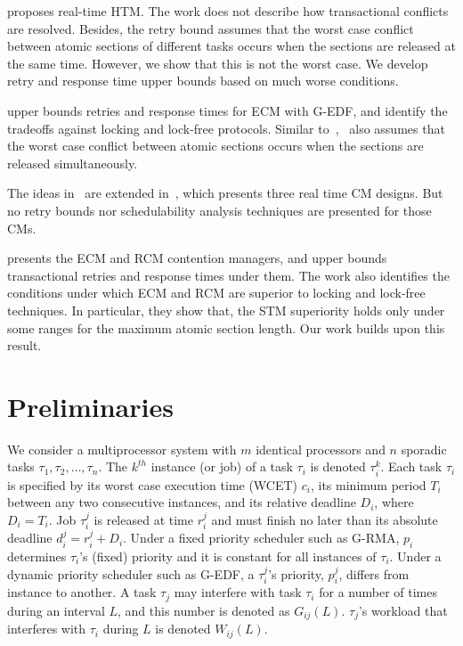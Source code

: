 \documentclass[conference]{IEEEtran}
\begin{document}
\cite{schoeberl2010rttm} proposes real-time HTM. The work does not describe how transactional conflicts are resolved. Besides, the retry bound assumes that the worst case conflict between atomic sections of different tasks occurs when the sections are released at the same time. However, we show that this is not the worst case. We develop retry and response time upper bounds based on much worse conditions.


\cite{key-1} upper bounds retries and response times for  ECM with G-EDF, and identify the tradeoffs against locking and lock-free protocols. Similar to~\cite{schoeberl2010rttm},~\cite{key-1} also assumes that the worst case conflict between atomic sections occurs when the sections are released simultaneously. 

The ideas in~\cite{key-1} are extended in~\cite{barrosmanaging}, which presents three real time CM designs. But no retry bounds nor schedulability analysis techniques are presented for those CMs. 

\cite{stmconcurrencycontrol:emsoft11} presents the ECM and RCM contention managers, and upper bounds transactional retries and response times under them. The work also identifies the conditions under which ECM and RCM are superior to locking and lock-free techniques. In particular, they show that, the STM superiority holds only under some ranges for the maximum atomic section length. Our work builds upon this result.

\section{Preliminaries}
\label{sec:model}

We consider a multiprocessor system with $m$ identical processors and $n$ sporadic tasks $\tau_1, \tau_2,\ldots, \tau_n$. The $k^{th}$ instance (or job) of a task $\tau_i$ is denoted $\tau_i^k$. Each task $\tau_i$ is specified by its worst case execution time (WCET) $c_i$, its minimum period $T_i$ between any two consecutive instances, and its relative deadline $D_i$, where $D_i=T_i$. Job $\tau_i^j$ is released at time $r_i^j$ and must finish no later than its absolute deadline $d_i^j=r_i^j+D_i$. Under a fixed priority scheduler such as G-RMA, $p_i$ determines $\tau_i$'s (fixed) priority and it is constant for all instances of $\tau_i$. Under a dynamic priority scheduler such as G-EDF, a $\tau_i^j$'s priority, $p_i^j$, differs from  instance to another. 
A task $\tau_j$ may interfere with task $\tau_i$ for a number of times during an interval $L$, and this number is denoted as $G_{ij}(L)$. 
$\tau_j$'s workload that interferes with $\tau_i$ during $L$ is denoted $W_{ij}(L)$.
\end{document}
